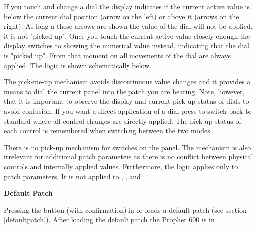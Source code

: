 If you touch and change a dial the display indicates if the current active value is below the current dial position (arrow on the left) or above it (arrows on the right). As long a these arrows are shown the value of the dial will not be applied, it is not "picked up". Once you touch the current active value closely enough the display switches to showing the numerical value instead, indicating that the dial is "picked up". From that moment on all movements of the dial are always applied. The logic is shown schematically below.


The pick-me-up mechanism avoids discontinuous value changes and it provides a means to dial the current panel into the patch you are hearing. Note, however, that it is important to observe the display and current pick-up status of dials to avoid confusion. If you want a direct application of a dial press \totape to switch back to standard \presetpatch where all control changes are directly applied. The pick-up status of each control is remembered when switching between the two modes.

There is no pick-up mechanism for switches on the panel. The mechanism is also irrelevant for additional patch parameters as there is no conflict between physical controls and internally applied values. Furthermore, the logic applies only to patch parameters. It is not applied to \mastertune, \mastervol, \pitchbender and \modwheel.

\textbf{Default Patch}

Pressing the \preset button (with confirmation) in \shiftmode or \shiftlock loads a default patch (see section \ref{defaultpatch}). After loading the default patch the Prophet 600 is in \presetpatch.
